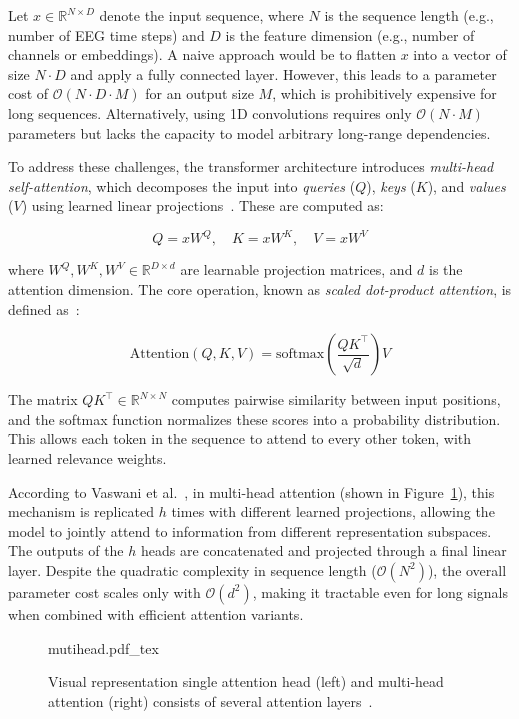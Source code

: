 Let $x \in \mathbb{R}^{N \times D}$ denote the input sequence, where $N$ is the sequence length (e.g., number of EEG time steps) and $D$ is the feature dimension (e.g., number of channels or embeddings). A naive approach would be to flatten $x$ into a vector of size $N \cdot D$ and apply a fully connected layer. However, this leads to a parameter cost of $\mathcal{O}(N \cdot D \cdot M)$ for an output size $M$, which is prohibitively expensive for long sequences. Alternatively, using 1D convolutions requires only $\mathcal{O}(N \cdot M)$ parameters but lacks the capacity to model arbitrary long-range dependencies.

To address these challenges, the transformer architecture introduces \textit{multi-head self-attention}, which decomposes the input into \textit{queries} ($Q$), \textit{keys} ($K$), and \textit{values} ($V$) using learned linear projections~\cite{vaswani2017attention}. These are computed as:

\[
Q = xW^Q, \quad K = xW^K, \quad V = xW^V
\]

where $W^Q, W^K, W^V \in \mathbb{R}^{D \times d}$ are learnable projection matrices, and $d$ is the attention dimension. The core operation, known as \textit{scaled dot-product attention}, is defined as~\cite{vaswani2017attention}:

\begin{equation}
\text{Attention}(Q, K, V) = \text{softmax} \left( \frac{QK^\top}{\sqrt{d}} \right) V
\label{eq:attention}
\end{equation}

The matrix $QK^\top \in \mathbb{R}^{N \times N}$ computes pairwise similarity between input positions, and the softmax function normalizes these scores into a probability distribution. This allows each token in the sequence to attend to every other token, with learned relevance weights.

According to Vaswani et al.~\cite{vaswani2017attention}, in multi-head attention (shown in Figure~\ref{fig:multihead}), this mechanism is replicated $h$ times with different learned projections, allowing the model to jointly attend to information from different representation subspaces. The outputs of the $h$ heads are concatenated and projected through a final linear layer. Despite the quadratic complexity in sequence length ($\mathcal{O}(N^2)$), the overall parameter cost scales only with $\mathcal{O}(d^2)$, making it tractable even for long signals when combined with efficient attention variants.

\begin{figure}[h!]
	\centering
        \def\svgwidth{400pt}
 	{mutihead.pdf_tex} 	  	 	
	\caption[Visual representation of a 2D convolution operation]{Visual representation single attention head (left) and multi-head attention (right) consists of several attention layers~\cite{vaswani2017attention}.}
	\label{fig:multihead}
\end{figure}

